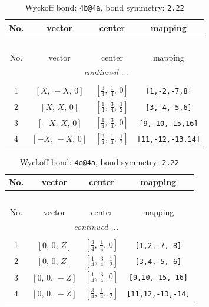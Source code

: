 \documentclass[fleqn,8pt]{jsarticle}
\begin{document}
\begin{longtable}{cccc}
\caption{Wyckoff bond: {\tt 4b@4a}, bond symmetry: {\tt 2.22}}
 \\
 \hline \hline
No. & vector & center & mapping \\ \hline \endfirsthead

\multicolumn{3}{l}{\tablename\ \thetable{}} \\
 \hline \hline
No. & vector & center & mapping \\ \hline \endhead

 \hline \hline
\multicolumn{3}{r}{\footnotesize\it continued ...} \\ \endfoot

 \hline \hline
\multicolumn{3}{r}{} \\ \endlastfoot

1 & $\left[ X,\, - X,\, 0 \right]$ & $\left[ \frac{3}{4},\, \frac{1}{4},\, 0 \right]$ & {\tt [1,-2,-7,8]} \\ \hline
2 & $\left[ X,\, X,\, 0 \right]$ & $\left[ \frac{1}{4},\, \frac{3}{4},\, \frac{1}{2} \right]$ & {\tt [3,-4,-5,6]} \\ \hline
3 & $\left[ - X,\, X,\, 0 \right]$ & $\left[ \frac{1}{4},\, \frac{3}{4},\, 0 \right]$ & {\tt [9,-10,-15,16]} \\ \hline
4 & $\left[ - X,\, - X,\, 0 \right]$ & $\left[ \frac{3}{4},\, \frac{1}{4},\, \frac{1}{2} \right]$ & {\tt [11,-12,-13,14]} \\
\end{longtable}
\renewcommand{\arraystretch}{1.2}
\begin{longtable}{cccc}
\caption{Wyckoff bond: {\tt 4c@4a}, bond symmetry: {\tt 2.22}}
 \\
 \hline \hline
No. & vector & center & mapping \\ \hline \endfirsthead

\multicolumn{3}{l}{\tablename\ \thetable{}} \\
 \hline \hline
No. & vector & center & mapping \\ \hline \endhead

 \hline \hline
\multicolumn{3}{r}{\footnotesize\it continued ...} \\ \endfoot

 \hline \hline
\multicolumn{3}{r}{} \\ \endlastfoot

1 & $\left[ 0,\, 0,\, Z \right]$ & $\left[ \frac{3}{4},\, \frac{1}{4},\, 0 \right]$ & {\tt [1,2,-7,-8]} \\ \hline
2 & $\left[ 0,\, 0,\, Z \right]$ & $\left[ \frac{1}{4},\, \frac{3}{4},\, \frac{1}{2} \right]$ & {\tt [3,4,-5,-6]} \\ \hline
3 & $\left[ 0,\, 0,\, - Z \right]$ & $\left[ \frac{1}{4},\, \frac{3}{4},\, 0 \right]$ & {\tt [9,10,-15,-16]} \\ \hline
4 & $\left[ 0,\, 0,\, - Z \right]$ & $\left[ \frac{3}{4},\, \frac{1}{4},\, \frac{1}{2} \right]$ & {\tt [11,12,-13,-14]} \\
\end{longtable}
\end{document}
